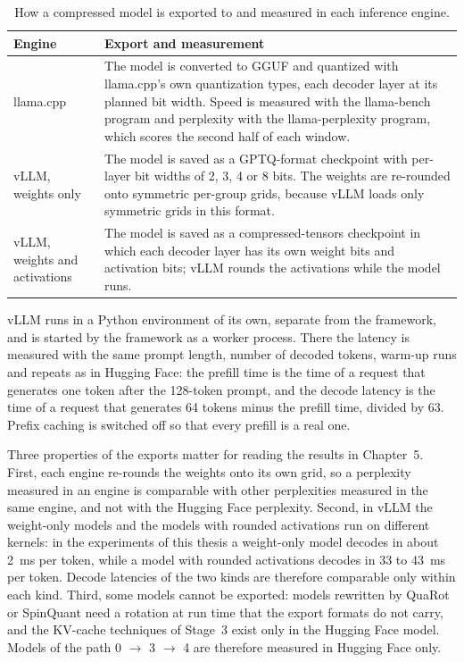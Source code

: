 \documentclass[
11pt, %
english, %
singlespacing, %
headsepline, %
]{MastersDoctoralThesis} %
\begin{document}
\begin{table}[htbp]
\centering
\small
\caption{How a compressed model is exported to and measured in each inference engine.}
\label{tab:ch4-engines}
\renewcommand{\arraystretch}{1.2}
\begin{tabularx}{\textwidth}{lX}
\hline
\textbf{Engine} & \textbf{Export and measurement} \\
\hline
llama.cpp & The model is converted to GGUF \cite{ggml2025gguf} and quantized with llama.cpp's own quantization types, each decoder layer at its planned bit width. Speed is measured with the llama-bench program and perplexity with the llama-perplexity program, which scores the second half of each window. \\
vLLM, weights only & The model is saved as a GPTQ-format checkpoint with per-layer bit widths of 2, 3, 4 or 8 bits. The weights are re-rounded onto symmetric per-group grids, because vLLM loads only symmetric grids in this format. \\
vLLM, weights and activations & The model is saved as a compressed-tensors checkpoint in which each decoder layer has its own weight bits and activation bits; vLLM rounds the activations while the model runs. \\
\hline
\end{tabularx}
\end{table}

vLLM runs in a Python environment of its own, separate from the framework, and is started by the framework as a worker process. There the latency is measured with the same prompt length, number of decoded tokens, warm-up runs and repeats as in Hugging Face: the prefill time is the time of a request that generates one token after the 128-token prompt, and the decode latency is the time of a request that generates 64 tokens minus the prefill time, divided by 63. Prefix caching is switched off so that every prefill is a real one.

Three properties of the exports matter for reading the results in Chapter~5. First, each engine re-rounds the weights onto its own grid, so a perplexity measured in an engine is comparable with other perplexities measured in the same engine, and not with the Hugging Face perplexity. Second, in vLLM the weight-only models and the models with rounded activations run on different kernels: in the experiments of this thesis a weight-only model decodes in about 2~ms per token, while a model with rounded activations decodes in 33 to 43~ms per token. Decode latencies of the two kinds are therefore comparable only within each kind. Third, some models cannot be exported: models rewritten by QuaRot or SpinQuant need a rotation at run time that the export formats do not carry, and the KV-cache techniques of Stage~3 exist only in the Hugging Face model. Models of the path 0 $\rightarrow$ 3 $\rightarrow$ 4 are therefore measured in Hugging Face only.
\end{document}
